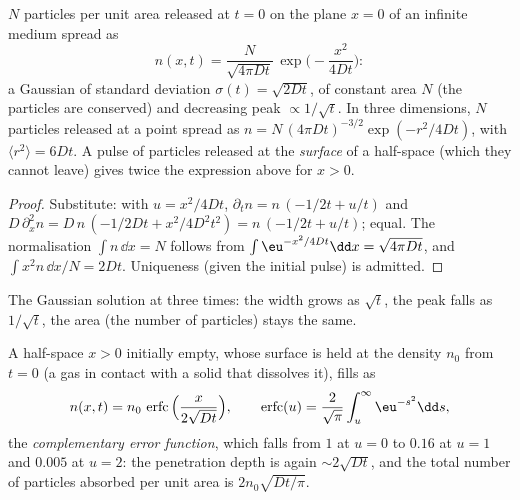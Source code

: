 \begin{proposition}\label{prop:b2:particle-diffusion:gaussian}
$N$ particles per unit area released at $t = 0$ on the plane $x = 0$ of
an infinite medium spread as
\[
n(x,t) = \frac{N}{\sqrt{4\pi D t}}\,\exp\Big(-\frac{x^2}{4Dt}\Big) :
\]
a Gaussian of standard deviation $\sigma(t) = \sqrt{2Dt}$, of constant
area $N$ (the particles are conserved) and decreasing peak $\propto
1/\sqrt t$. In three dimensions, $N$ particles released at a point
spread as $n = N\,(4\pi Dt)^{-3/2}\exp(-r^2/4Dt)$, with $\langle r^2
\rangle = 6Dt$. A pulse of particles released at the \emph{surface} of
a half-space (which they cannot leave) gives twice the expression above
for $x > 0$.
\end{proposition}

\begin{proof}
Substitute: with $u = x^2/4Dt$, $\partial_t n = n\,(-1/2t + u/t)$ and
$D\,\partial_x^2 n = D\,n\,(-1/2Dt + x^2/4D^2t^2) = n\,(-1/2t + u/t)$;
equal. The normalisation $\int n\,\dd x = N$ follows from $\int
\eu^{-x^2/4Dt}\dd x = \sqrt{4\pi Dt}$, and $\int x^2 n\,\dd x/N = 2Dt$.
Uniqueness (given the initial pulse) is admitted.
\end{proof}

\begin{omfigure}

{\small The Gaussian solution at three times: the width grows as
$\sqrt t$, the peak falls as $1/\sqrt t$, the area (the number of
particles) stays the same.}
\end{omfigure}

\begin{proposition}\label{prop:b2:particle-diffusion:erfc}
A half-space $x > 0$ initially empty, whose surface is held at the
density $n_0$ from $t = 0$ (a gas in contact with a solid that
dissolves it), fills as
\[
n(x,t) = n_0\,\operatorname{erfc}\Big(\frac{x}{2\sqrt{Dt}}\Big),
\qquad
\operatorname{erfc}(u) = \frac{2}{\sqrt\pi}\int_u^{\infty}\eu^{-s^2}\dd s,
\]
the \emph{complementary error function}, which falls from $1$ at $u =
0$ to $0.16$ at $u = 1$ and $0.005$ at $u = 2$: the penetration depth is
again $\sim 2\sqrt{Dt}$, and the total number of particles absorbed per
unit area is $2n_0\sqrt{Dt/\pi}$.
\end{proposition}


